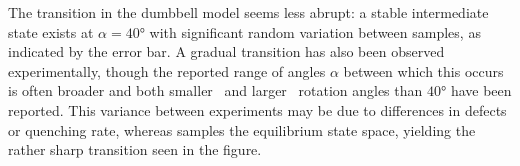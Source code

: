 \vspace{-1em}
\vspace{-0.5em}

The transition in the dumbbell model seems less abrupt: a stable intermediate state exists at $\alpha=\ang{40}$ with significant random variation between samples, as indicated by the error bar. %
A gradual transition has also been observed experimentally, though the reported range of angles $\alpha$ between which this occurs is often broader and both smaller~\cite{ProbingAFM-PMtransition} and larger~\cite{AFM-FM-transition-Pinwheel} rotation angles than $\ang{40}$ have been reported.
This variance between experiments may be due to differences in defects or quenching rate, whereas  samples the equilibrium state space, yielding the rather sharp transition seen in the figure.

\newpage
